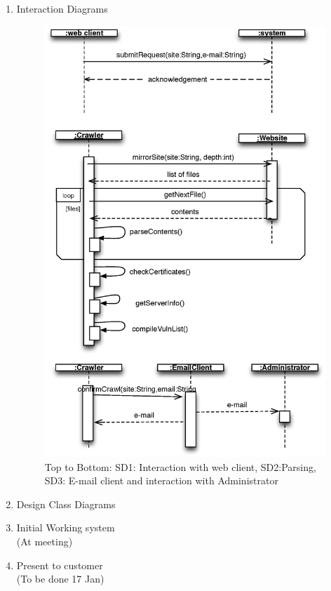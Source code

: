 \documentclass{article}
\begin{document}
\begin{enumerate}
\newpage
\item Interaction Diagrams\\
\begin{figure}[H]
\includegraphics[width=.7\textwidth]{SSDs}
\caption{Top to Bottom: SD1: Interaction with web client, SD2:Parsing, SD3: E-mail client and interaction with Administrator}
\end{figure}
\item Design Class Diagrams\\
\item Initial Working system\\ (At meeting)
\item Present to customer\\ (To be done 17 Jan)

\end{enumerate}
\end{document}
